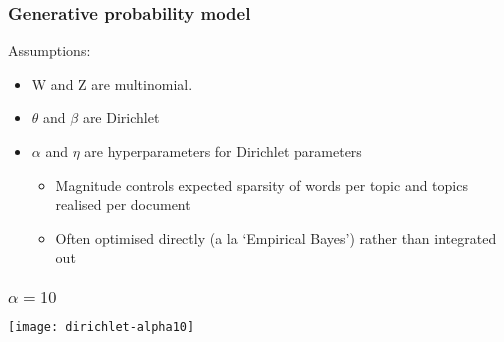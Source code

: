 \documentclass[11pt,compress,professionalfonts]{beamer}
\newcommand{\ita}{\begin{itemize}}
\newcommand{\itm}{\item[]}
\newcommand{\itz}{\end{itemize}}
\begin{document}
\begin{frame}[t,fragile]\frametitle{Generative probability model}

Assumptions:
\ita
\itm W and Z are multinomial.
\itm $\theta$ and $\beta$ are Dirichlet
\itm $\alpha$ and $\eta$ are hyperparameters for Dirichlet parameters
\ita
\item Magnitude controls expected sparsity of words per topic and topics realised per document
\item Often optimised directly (a la `Empirical Bayes') rather than integrated out
\itz
\itz

\end{frame}
\begin{frame}[t,fragile]\frametitle{$\alpha=10$}

\centerline{\texttt{[image: dirichlet-alpha10]}}

\end{frame}
\end{document}
